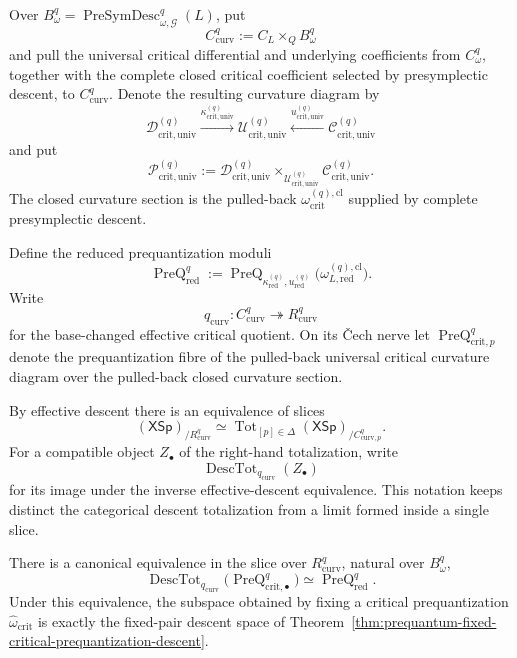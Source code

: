 Over $B_\omega^q=\operatorname{PreSymDesc}_{\omega,\mathcal G}^{q}(L)$, put
\[
C_{\mathrm{curv}}^q:=C_L\times_QB_\omega^q
\]
and pull the universal critical differential and underlying coefficients from
$C_\omega^q$, together with the complete closed critical coefficient selected by
presymplectic descent, to $C_{\mathrm{curv}}^q$.  Denote the resulting curvature
diagram by
\[
\mathscr D_{\mathrm{crit,univ}}^{(q)}
\xrightarrow{\kappa_{\mathrm{crit,univ}}^{(q)}}
\mathscr U_{\mathrm{crit,univ}}^{(q)}
\xleftarrow{u_{\mathrm{crit,univ}}^{(q)}}
\mathscr C_{\mathrm{crit,univ}}^{(q)}
\]
and put
\[
\mathscr P_{\mathrm{crit,univ}}^{(q)}
:=
\mathscr D_{\mathrm{crit,univ}}^{(q)}
\times_{\mathscr U_{\mathrm{crit,univ}}^{(q)}}
\mathscr C_{\mathrm{crit,univ}}^{(q)}.
\]
The closed curvature section is the pulled-back
$\omega_{\mathrm{crit}}^{(q),\mathrm{cl}}$ supplied by complete presymplectic
descent.

Define the reduced prequantization moduli
\[
\boxed{
\operatorname{PreQ}_{\mathrm{red}}^q
:=
\operatorname{PreQ}_{\kappa_{\mathrm{red}}^{(q)},u_{\mathrm{red}}^{(q)}}
\bigl(\omega_{L,\mathrm{red}}^{(q),\mathrm{cl}}\bigr).
}
\]
Write
\[
q_{\mathrm{curv}}:
C_{\mathrm{curv}}^q\twoheadrightarrow R_{\mathrm{curv}}^q
\]
for the base-changed effective critical quotient.  On its \v{C}ech nerve let
$\operatorname{PreQ}_{\mathrm{crit},p}^q$ denote the prequantization fibre of the
pulled-back universal critical curvature diagram over the pulled-back closed
curvature section.

By effective descent there is an equivalence of slices
\[
(\mathsf{XSp})_{/R_{\mathrm{curv}}^q}
\simeq
\operatorname{Tot}_{[p]\in\Delta}
(\mathsf{XSp})_{/C_{\mathrm{curv},p}^q}.
\]
For a compatible object $Z_\bullet$ of the right-hand totalization, write
\[
\operatorname{DescTot}_{q_{\mathrm{curv}}}(Z_\bullet)
\]
for its image under the inverse effective-descent equivalence.  This notation
keeps distinct the categorical descent totalization from a limit formed inside a
single slice.

\begin{theorem}
\label{thm:prequantum-commutes-with-reduction}
There is a canonical equivalence in the slice over
$R_{\mathrm{curv}}^q$, natural over $B_\omega^q$,
\[
\boxed{
\operatorname{DescTot}_{q_{\mathrm{curv}}}
\bigl(\operatorname{PreQ}_{\mathrm{crit},\bullet}^q\bigr)
\simeq
\operatorname{PreQ}_{\mathrm{red}}^q.
}
\]
Under this equivalence, the subspace obtained by fixing a critical
prequantization $\widehat\omega_{\mathrm{crit}}$ is exactly the fixed-pair descent
space of
Theorem~\ref{thm:prequantum-fixed-critical-prequantization-descent}.
\end{theorem}


